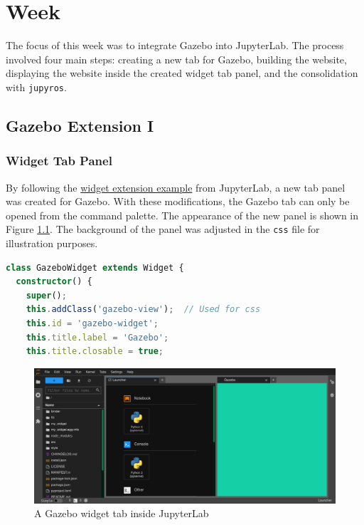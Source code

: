 \chapter{Week}

    The focus of this week was to integrate Gazebo into JupyterLab. The process involved four main steps: creating a new tab for Gazebo, building the website, displaying the website inside the created widget tab panel, and the consolidation with \texttt{jupyros}.

\section{Gazebo Extension I}

\subsection{Widget Tab Panel}

    By following the \href{https://github.com/jupyterlab/extension-examples/tree/master/widgets}{widget extension example} from JupyterLab, a new tab panel was created for Gazebo. With these modifications, the Gazebo tab can only be opened from the command palette. The appearance of the new panel is shown in Figure \ref{fig:widgetTab}. The background of the panel was adjusted in the \texttt{css} file for illustration purposes. 
    
    \begin{lstlisting}[language=TypeScript]
class GazeboWidget extends Widget {
  constructor() {
    super();
    this.addClass('gazebo-view');  // Used for css
    this.id = 'gazebo-widget';
    this.title.label = 'Gazebo';
    this.title.closable = true;
    \end{lstlisting}

    \begin{figure}[hb]
        \centering
        \includegraphics[width=0.95\linewidth]{Images/06_widgetTab.png}
        \caption{A Gazebo widget tab inside JupyterLab}
        \label{fig:widgetTab}
    \end{figure}
    

